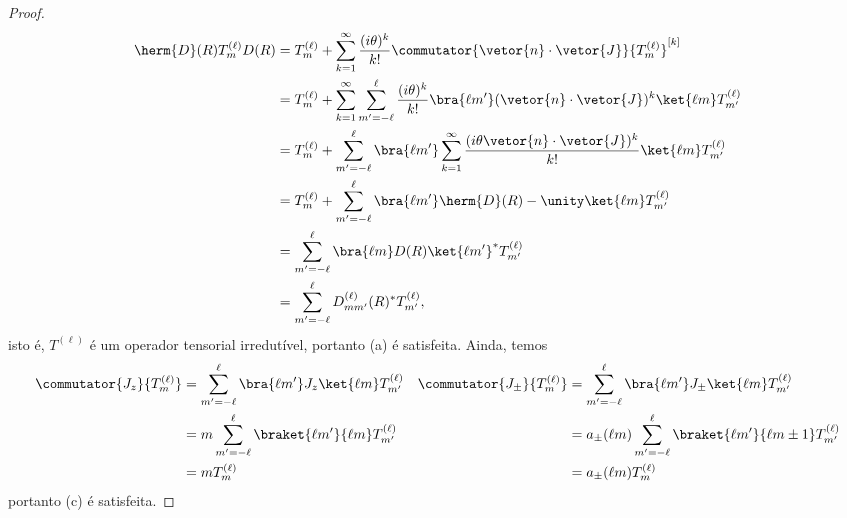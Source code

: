 \begin{proof}
   \begin{align*}
      \herm{D}(R) T^{(\ell)}_m D(R) &= T^{(\ell)}_m + \sum_{k = 1}^\infty{\frac{(i\theta)^k}{k!} \commutator{\vetor{n}\cdot\vetor{J}}{T^{(\ell)}_m}^{[k]}}\\
                                    &= T^{(\ell)}_m + \sum_{k = 1}^\infty{\sum_{m' = - \ell}^{\ell}{\frac{(i\theta)^k}{k!} \bra{\ell m'}(\vetor{n}\cdot \vetor{J})^k\ket{\ell m}T^{(\ell)}_{m'}}}\\
                                    &= T^{(\ell)}_m + \sum_{m' = -\ell}^{\ell}{\bra{\ell m'}\sum_{k = 1}^\infty{\frac{(i\theta \vetor{n}\cdot \vetor{J})^k}{k!}}\ket{\ell m}T^{(\ell)}_{m'}}\\
                                    &= T^{(\ell)}_m + \sum_{m' = - \ell}^{\ell}{\bra{\ell m'} \herm{D}(R) - \unity \ket{\ell m} T^{(\ell)}_{m'}}\\
                                    &= \sum_{m' = - \ell}^{\ell}{\bra{\ell m}D(R)\ket{\ell m'}^*T^{(\ell)}_{m'}}\\
                                    &= \sum_{m' = - \ell}^{\ell}{D^{(\ell)}_{mm'}(R)^* T^{(\ell)}_{m'}},
   \end{align*}
   isto é, \(T^{(\ell)}\) é um operador tensorial irredutível, portanto (a) é satisfeita. Ainda, temos
   \begin{align*}
      \commutator{J_z}{T^{(\ell)}_m} 
      &= \sum_{m' = -\ell}^{\ell}{\bra{\ell m'}J_z\ket{\ell m} T^{(\ell)}_{m'}}&
      \commutator{J_\pm}{T^{(\ell)}_m} 
      &= \sum_{m' = -\ell}^{\ell}{\bra{\ell m'}J_\pm\ket{\ell m} T^{(\ell)}_{m'}}\\
      &= m\sum_{m' = - \ell}^\ell{\braket{\ell m'}{\ell m} T^{(\ell)}_{m'}}&
      &= a_{\pm}(\ell m)\sum_{m' = - \ell}^\ell{\braket{\ell m'}{\ell {m\pm1}} T^{(\ell)}_{m'}}\\
      &= m T^{(\ell)}_{m}&
      &= a_{\pm}(\ell m) T^{(\ell)}_{m}
   \end{align*}
   portanto (c) é satisfeita.


\end{proof}
